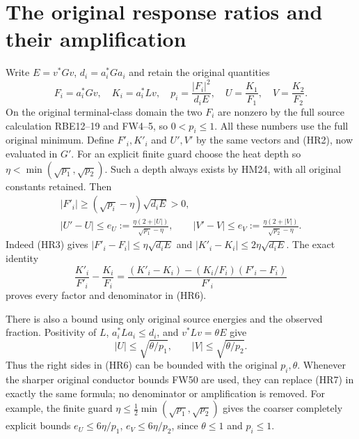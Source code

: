 \documentclass[11pt]{article}
\begin{document}
\section{The original response ratios and their amplification}
Write $E=v^*Gv$, $d_i=a_i^*Ga_i$ and retain the original quantities
\begin{equation}\tag{HR5}
 F_i=a_i^*Gv,\quad K_i=a_i^*Lv,\quad
 p_i=\frac{|F_i|^2}{d_iE},\quad
 U=\frac{K_1}{F_1},\quad V=\frac{K_2}{F_2}.
\end{equation}
On the original terminal-class domain the two $F_i$ are nonzero by
the full source calculation RBE12--19 and FW4--5, so $0<p_i\le1$.
All these numbers use the full original minimum. Define $F'_i,K'_i$
and $U',V'$ by the same vectors and (HR2), now evaluated in $G'$.
For an explicit finite guard choose the heat depth so
$\eta<\min(\sqrt{p_1},\sqrt{p_2})$. Such a depth always exists by
HM24, with all original constants retained. Then
\begin{equation}\tag{HR6}
 \begin{gathered}
 |F'_i|\ge(\sqrt{p_i}-\eta)\sqrt{d_iE}>0,\\
 |U'-U|\le e_U:=\frac{\eta(2+|U|)}{\sqrt{p_1}-\eta},\qquad
 |V'-V|\le e_V:=\frac{\eta(2+|V|)}{\sqrt{p_2}-\eta}.
 \end{gathered}
\end{equation}
Indeed (HR3) gives $|F'_i-F_i|\le\eta\sqrt{d_iE}$ and
$|K'_i-K_i|\le2\eta\sqrt{d_iE}$. The exact identity
\[
 \frac{K'_i}{F'_i}-\frac{K_i}{F_i}
 =\frac{(K'_i-K_i)-(K_i/F_i)(F'_i-F_i)}{F'_i}
\]
proves every factor and denominator in (HR6).

There is also a bound using only original source energies and the
observed fraction. Positivity of $L$, $a_i^*La_i\le d_i$, and
$v^*Lv=\theta E$ give
\begin{equation}\tag{HR7}
 |U|\le\sqrt{\theta/p_1},\qquad |V|\le\sqrt{\theta/p_2}.
\end{equation}
Thus the right sides in (HR6) can be bounded with the original
$p_i,\theta$. Whenever the sharper original conductor bounds FW50
are used, they can replace (HR7) in exactly the same formula; no
denominator or amplification is removed. For example, the finite
guard $\eta\le\tfrac12\min(\sqrt{p_1},\sqrt{p_2})$ gives the
coarser completely explicit bounds $e_U\le6\eta/p_1$,
$e_V\le6\eta/p_2$, since $\theta\le1$ and $p_i\le1$.
\end{document}
